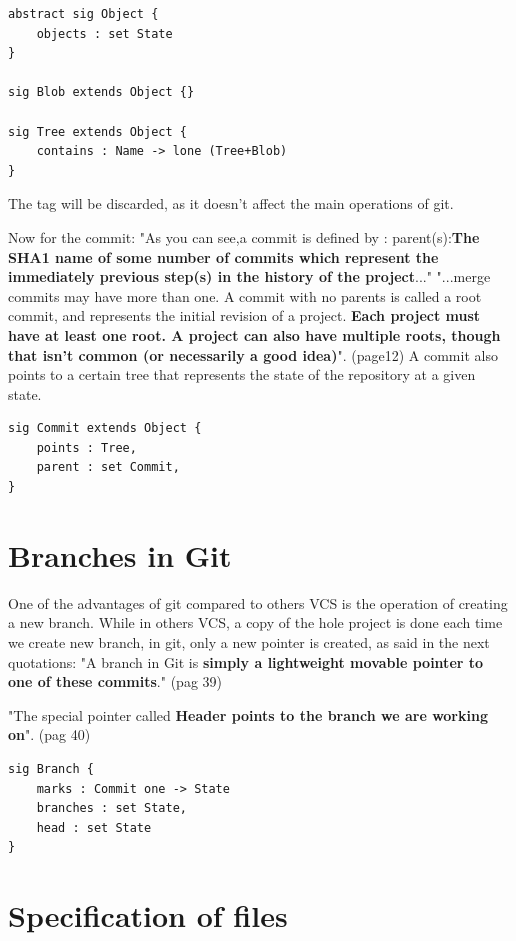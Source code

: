 \begin{lstlisting}
abstract sig Object {
	objects : set State
}

sig Blob extends Object {}

sig Tree extends Object {
	contains : Name -> lone (Tree+Blob)
}
\end{lstlisting}

The tag will be discarded, as it doesn't affect the main operations
of git. \par 

Now for the commit:  
"As you can see,a commit is defined by : 
parent(s):{\bf The SHA1 name of some number of commits which
represent the immediately previous step(s) in the 
history of the project}..."
"...merge commits may have more than one. A commit with no 
parents is called a root commit, and represents the 
initial revision of a project. {\bf Each project must have at
least one root. A project can also have multiple roots,
though that isn't common (or necessarily a good idea)}". 
\cite{gitComm} (page12) 
A commit also points to a certain tree that represents the state of the
repository at a given state. \par

\begin{lstlisting}
sig Commit extends Object {
	points : Tree,
	parent : set Commit,
}
\end{lstlisting}

\section{Branches in Git}
One of the advantages of git compared to others VCS is the operation
of creating a new branch. While in others VCS, a copy of the hole project is
done each time we create new branch, in git, only a new pointer is created, as
said in the next quotations:
"A branch in Git is {\bf simply a 
lightweight movable pointer to one of these commits}." \cite{progit} (pag 39) \par
"The special pointer called {\bf Header 
points to the branch we are working on}". \cite{progit} (pag 40) \par

\begin{lstlisting}
sig Branch {
	marks : Commit one -> State
	branches : set State,
	head : set State
}
\end{lstlisting}

\section{Specification of files}

